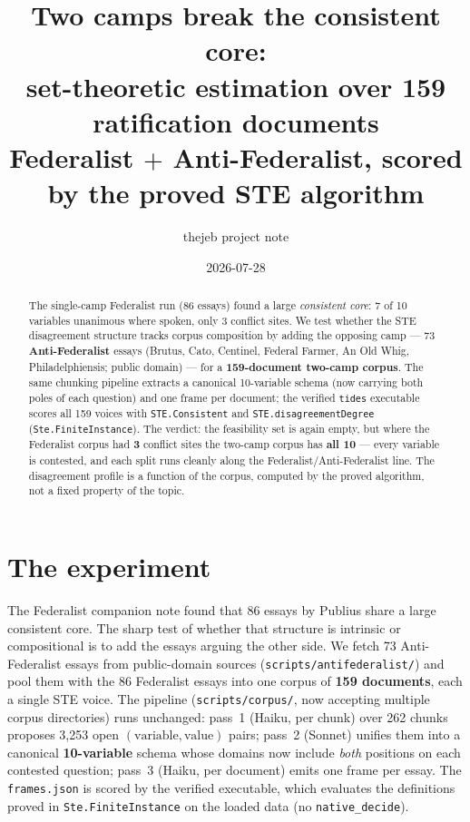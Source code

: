 \documentclass[11pt]{article}
\title{Two camps break the consistent core:\\
set-theoretic estimation over 159 ratification documents\\
\large Federalist $+$ Anti-Federalist, scored by the proved STE algorithm}
\author{thejeb project note}
\date{2026-07-28}
\newcommand{\lean}[1]{\texttt{#1}}
\begin{document}
\maketitle

\begin{abstract}
The single-camp Federalist run (86 essays) found a large \emph{consistent
core}: 7 of 10 variables unanimous where spoken, only 3 conflict sites. We
test whether the STE disagreement structure tracks corpus composition by
adding the opposing camp --- 73 \textbf{Anti-Federalist} essays (Brutus,
Cato, Centinel, Federal Farmer, An Old Whig, Philadelphiensis; public
domain) --- for a \textbf{159-document two-camp corpus}. The same chunking
pipeline extracts a canonical 10-variable schema (now carrying both poles
of each question) and one frame per document; the verified \lean{tides}
executable scores all 159 voices with \lean{STE.Consistent} and
\lean{STE.disagreementDegree} (\lean{Ste.FiniteInstance}). The verdict:
the feasibility set is again empty, but where the Federalist corpus had
\textbf{3} conflict sites the two-camp corpus has \textbf{all 10} --- every
variable is contested, and each split runs cleanly along the
Federalist/Anti-Federalist line. The disagreement profile is a function of
the corpus, computed by the proved algorithm, not a fixed property of the
topic.
\end{abstract}

\section{The experiment}

The Federalist companion note found that 86 essays by Publius share a large
consistent core. The sharp test of whether that structure is intrinsic or
compositional is to add the essays arguing the other side. We fetch 73
Anti-Federalist essays from public-domain sources
(\lean{scripts/antifederalist/}) and pool them with the 86 Federalist
essays into one corpus of \textbf{159 documents}, each a single STE voice.
The pipeline (\lean{scripts/corpus/}, now accepting multiple corpus
directories) runs unchanged: pass~1 (Haiku, per chunk) over 262 chunks
proposes 3{,}253 open $(\text{variable},\text{value})$ pairs; pass~2
(Sonnet) unifies them into a canonical \textbf{10-variable} schema whose
domains now include \emph{both} positions on each contested question;
pass~3 (Haiku, per document) emits one frame per essay. The
\lean{frames.json} is scored by the verified executable, which evaluates
the definitions proved in \lean{Ste.FiniteInstance} on the loaded data (no
\lean{native\_decide}).
\end{document}
